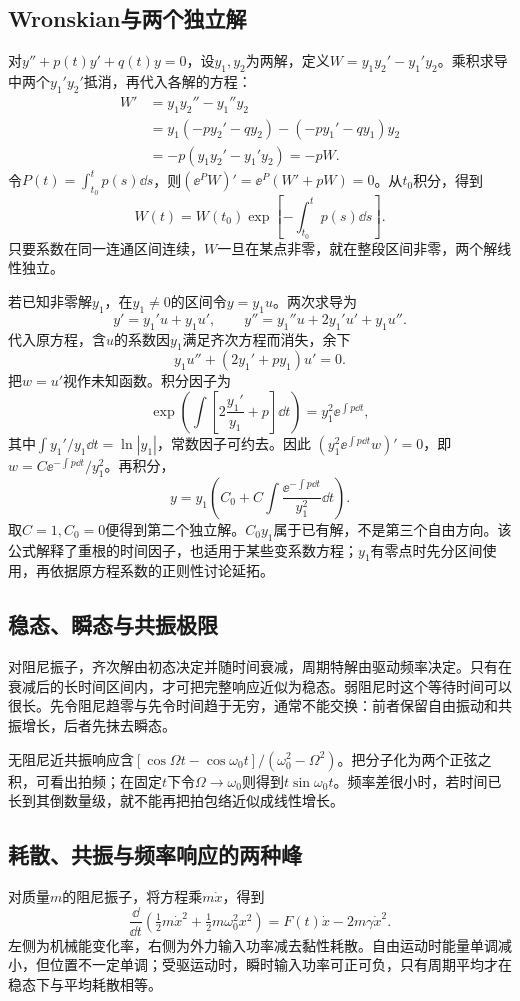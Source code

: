 \subsection{Wronskian与两个独立解}
对$y''+p(t)y'+q(t)y=0$，设$y_1,y_2$为两解，定义$W=y_1y_2'-y_1'y_2$。乘积求导中两个$y_1'y_2'$抵消，再代入各解的方程：
\[\begin{aligned}
W'&=y_1y_2''-y_1''y_2\\
&=y_1(-py_2'-qy_2)-(-py_1'-qy_1)y_2\\
&=-p(y_1y_2'-y_1'y_2)=-pW.
\end{aligned}\]
令$P(t)=\int_{t_0}^tp(s)\dd s$，则$(\ee^PW)'=\ee^P(W'+pW)=0$。从$t_0$积分，得到
\[W(t)=W(t_0)\exp\!\left[-\int_{t_0}^tp(s)\dd s\right].\]
只要系数在同一连通区间连续，$W$一旦在某点非零，就在整段区间非零，两个解线性独立。

若已知非零解$y_1$，在$y_1\ne0$的区间令$y=y_1u$。两次求导为
\[y'=y_1'u+y_1u',\qquad
y''=y_1''u+2y_1'u'+y_1u''.\]
代入原方程，含$u$的系数因$y_1$满足齐次方程而消失，余下
\[y_1u''+(2y_1'+py_1)u'=0.\]
把$w=u'$视作未知函数。积分因子为
\[\exp\!\left(\int\left[2\frac{y_1'}{y_1}+p\right]\dd t\right)
=y_1^2\ee^{\int p\dd t},\]
其中$\int y_1'/y_1\dd t=\ln|y_1|$，常数因子可约去。因此
$(y_1^2\ee^{\int p\dd t}w)'=0$，即$w=C\ee^{-\int p\dd t}/y_1^2$。再积分，
\[y=y_1\left(C_0+C\int\frac{\ee^{-\int p\dd t}}{y_1^2}\dd t\right).
\]
取$C=1,C_0=0$便得到第二个独立解。$C_0y_1$属于已有解，不是第三个自由方向。该公式解释了重根的时间因子，也适用于某些变系数方程；$y_1$有零点时先分区间使用，再依据原方程系数的正则性讨论延拓。

\subsection{稳态、瞬态与共振极限}
对阻尼振子，齐次解由初态决定并随时间衰减，周期特解由驱动频率决定。只有在衰减后的长时间区间内，才可把完整响应近似为稳态。弱阻尼时这个等待时间可以很长。先令阻尼趋零与先令时间趋于无穷，通常不能交换：前者保留自由振动和共振增长，后者先抹去瞬态。

无阻尼近共振响应含$[\cos\Omega t-\cos\omega_0t]/(\omega_0^2-\Omega^2)$。把分子化为两个正弦之积，可看出拍频；在固定$t$下令$\Omega\to\omega_0$则得到$t\sin\omega_0t$。频率差很小时，若时间已长到其倒数量级，就不能再把拍包络近似成线性增长。

\subsection{耗散、共振与频率响应的两种峰}
对质量$m$的阻尼振子，将方程乘$m\dot x$，得到
\[\frac{\dd}{\dd t}\left(\tfrac12m\dot x^2+\tfrac12m\omega_0^2x^2\right)
=F(t)\dot x-2m\gamma\dot x^2.\]
左侧为机械能变化率，右侧为外力输入功率减去黏性耗散。自由运动时能量单调减小，但位置不一定单调；受驱运动时，瞬时输入功率可正可负，只有周期平均才在稳态下与平均耗散相等。

